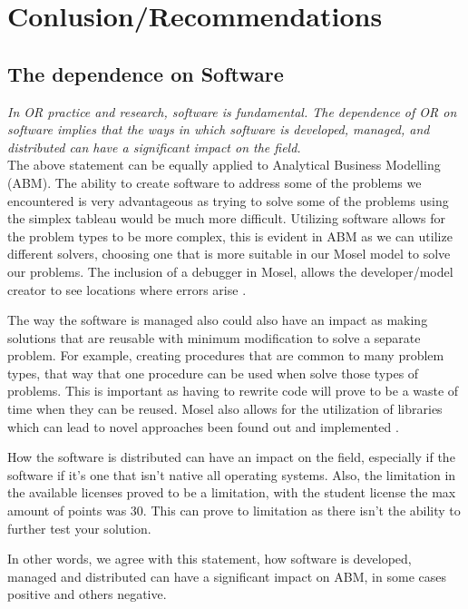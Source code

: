 \documentclass[a4paper,11pt]{article}
\begin{document}
\section{Conlusion/Recommendations}

\subsection*{The dependence on Software}
\textit{ In OR practice and research, software is fundamental. The dependence
of OR on software implies that the ways in which software is developed, managed, and distributed can
have a significant impact on the field.}\\

The above statement can be equally applied to Analytical Business Modelling (ABM). The ability to create software to address some of the problems we encountered is very advantageous as trying to solve some of the problems using the simplex tableau would be much more difficult. Utilizing software allows for the problem types to be more complex, this is evident in ABM as we can utilize different solvers, choosing one that is more suitable in our Mosel model to solve our problems. The inclusion of a debugger in Mosel, allows the developer/model creator to see locations where errors arise \cite{colombani2002mosel}.

The way the software is managed also could also have an impact as making solutions that are reusable with minimum modification to solve a separate problem. For example, creating procedures that are common to many problem types, that way that one procedure can be used when solve those types of problems. This is important as having to rewrite code will prove to be a waste of time when they can be reused. Mosel also allows for the utilization of libraries which can lead to novel approaches been found out and implemented \cite{colombani2002mosel}.

How the software is distributed can have an impact on the field, especially if the software if it's one that isn't native all operating systems. Also, the limitation in the available licenses proved to be a limitation, with the student license the max amount of points was 30. This can prove to limitation as there isn't the ability to further test your solution.

In other words, we agree with this statement, how software is developed, managed and distributed can have a significant impact on ABM, in some cases positive and others negative. 
\end{document}
